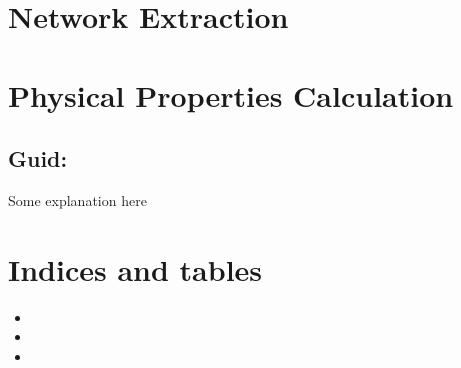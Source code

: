 \documentclass[a4paper,10pt,english]{report}
\begin{document}
\chapter{Network Extraction}
\label{\detokenize{index:network-extraction}}

\chapter{Physical Properties Calculation}
\label{\detokenize{index:physical-properties-calculation}}

\section{Guid:}
\label{\detokenize{index:guid}}
Some explanation here


\chapter{Indices and tables}
\label{\detokenize{index:indices-and-tables}}\begin{itemize}
\item {} 

\item {} 

\item {} 

\end{itemize}



\renewcommand{\indexname}{Index}
\printindex
\end{document}
